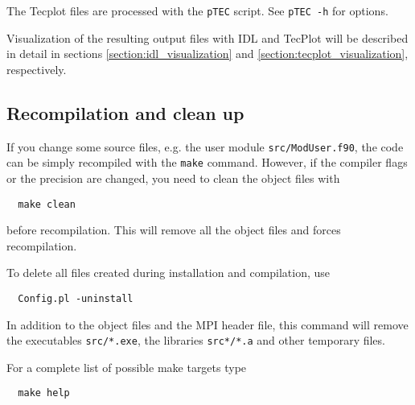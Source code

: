 The Tecplot files are processed with the {\tt pTEC} script.
See {\tt pTEC -h} for options.

Visualization of the resulting output files with IDL and TecPlot
will be described in detail in sections \ref{section:idl_visualization}
and \ref{section:tecplot_visualization}, respectively.

\subsection{Recompilation and clean up}

If you change some source files, e.g. the user module {\tt src/ModUser.f90},
the code can be simply recompiled with the {\tt make} command. 
However, if the compiler flags or the precision are changed, you need to clean the
object files with
\begin{verbatim}
  make clean
\end{verbatim}
before recompilation. This will remove all the object files and forces recompilation.

To delete all files created during installation and compilation, use
\begin{verbatim}
  Config.pl -uninstall
\end{verbatim}
In addition to the object files and the MPI header file, 
this command will remove the executables {\tt src/*.exe}, 
the libraries {\tt src*/*.a} and other temporary files.

For a complete list of possible make targets type
\begin{verbatim}
  make help
\end{verbatim}
